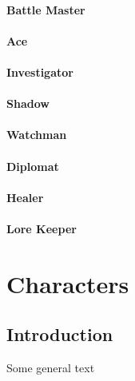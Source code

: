 \documentclass[a4paper,10pt,final,twocolumn,oneside]{book}
\begin{document}
\subsubsection{Battle Master}

\subsubsection{Ace}

\subsubsection{Investigator}

\subsubsection{Shadow}

\subsubsection{Watchman}

\subsubsection{Diplomat}

\subsubsection{Healer}

\subsubsection{Lore Keeper}



\clearpage


\chapter{Characters} %
\label{cha:characters}

\section{Introduction} %
\label{sec:introduction}

Some general text
\end{document}
